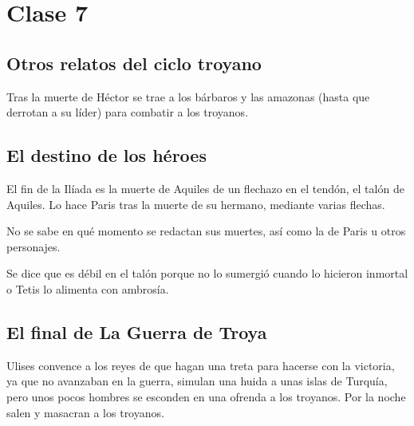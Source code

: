\chapter{Clase 7}\label{ch:clase7}

\section{Otros relatos del ciclo troyano}
Tras la muerte de Héctor se trae a los bárbaros y las amazonas (hasta que derrotan a su líder) para combatir a los troyanos.

\section{El destino de los héroes}
El fin de la Ilíada es la muerte de Aquiles de un flechazo en el tendón, el talón de Aquiles. Lo hace Paris tras la muerte de su hermano, mediante varias flechas.

No se sabe en qué momento se redactan sus muertes, así como la de Paris u otros personajes.

Se dice que es débil en el talón porque no lo sumergió cuando lo hicieron inmortal o Tetis lo alimenta con ambrosía.

\section{El final de La Guerra de Troya}
Ulises convence a los reyes de que hagan una treta para hacerse con la victoria, ya que no avanzaban en la guerra, simulan una huida a unas islas de Turquía, pero unos pocos hombres se esconden en una ofrenda a los troyanos. Por la noche salen y masacran a los troyanos.

